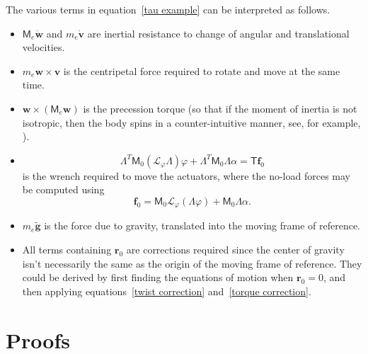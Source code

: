 \documentclass[reqno,12pt]{amsart}
\newcommand{\liederiv}{\mathcal L}
\begin{document}
The various terms in equation~\eqref{tau example} can be interpreted as follows.
\begin{itemize}
\item $\mathsf M_e \dot{\bm w}$ and $m_e \dot{\bm v}$ are inertial resistance to change of angular and translational velocities.
\item $m_e \bm w \times \bm v$ is the centripetal force required to rotate and move at the same time.
\item $\bm w \times (\mathsf M_e \bm w)$ is the precession torque (so that if the moment of inertia is not isotropic, then the body spins in a counter-intuitive manner, see, for example, \cite{kawano-et-al}).
\item
\begin{equation}
\mathsf \Lambda^T \mathsf M_0 (\liederiv_\varphi \mathsf \Lambda) \varphi + \mathsf\Lambda^T \mathsf M_0 \mathsf \Lambda \alpha = \mathsf T \bm f_0
\end{equation}
is the wrench required to move the actuators, where the no-load forces may be computed using
\begin{equation}
\bm f_0 = \mathsf M_0 \liederiv_\varphi(\mathsf\Lambda \varphi) + \mathsf M_0 \mathsf\Lambda \alpha .
\end{equation}
\item $m_e \tilde{\bm g}$ is the force due to gravity, translated into the moving frame of reference.
\item All terms containing $\bm r_0$ are corrections required since the center of gravity isn't necessarily the same as the origin of the moving frame of reference.  They could be derived by first finding the equations of motion when $\bm r_0 = 0$, and then applying equations~\eqref{twist correction} and~\eqref{torque correction}.
\end{itemize}

\section{Proofs}
\label{sec proofs}
\end{document}
